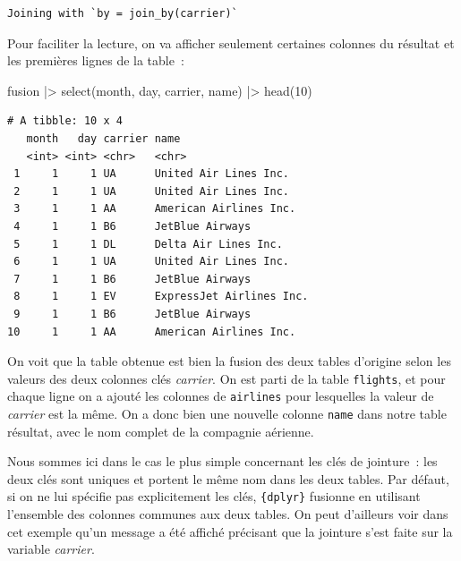 \documentclass[
  letterpaper,
  DIV=11,
  numbers=noendperiod,
  oneside]{scrreprt}
\newenvironment{Shaded}{\begin{snugshade}}{\end{snugshade}}
\newcommand{\DecValTok}[1]{\textcolor[rgb]{0.68,0.00,0.00}{#1}}
\newcommand{\FunctionTok}[1]{\textcolor[rgb]{0.28,0.35,0.67}{#1}}
\newcommand{\NormalTok}[1]{\textcolor[rgb]{0.00,0.23,0.31}{#1}}
\newcommand{\SpecialCharTok}[1]{\textcolor[rgb]{0.37,0.37,0.37}{#1}}
\begin{document}
\begin{verbatim}
Joining with `by = join_by(carrier)`
\end{verbatim}

Pour faciliter la lecture, on va afficher seulement certaines colonnes
du résultat et les premières lignes de la table~:

\begin{Shaded}
\begin{Highlighting}[]
\NormalTok{fusion }\SpecialCharTok{|\textgreater{}} 
  \FunctionTok{select}\NormalTok{(month, day, carrier, name) }\SpecialCharTok{|\textgreater{}} 
  \FunctionTok{head}\NormalTok{(}\DecValTok{10}\NormalTok{)}
\end{Highlighting}
\end{Shaded}

\begin{verbatim}
# A tibble: 10 x 4
   month   day carrier name                    
   <int> <int> <chr>   <chr>                   
 1     1     1 UA      United Air Lines Inc.   
 2     1     1 UA      United Air Lines Inc.   
 3     1     1 AA      American Airlines Inc.  
 4     1     1 B6      JetBlue Airways         
 5     1     1 DL      Delta Air Lines Inc.    
 6     1     1 UA      United Air Lines Inc.   
 7     1     1 B6      JetBlue Airways         
 8     1     1 EV      ExpressJet Airlines Inc.
 9     1     1 B6      JetBlue Airways         
10     1     1 AA      American Airlines Inc.  
\end{verbatim}

On voit que la table obtenue est bien la fusion des deux tables
d'origine selon les valeurs des deux colonnes clés \emph{carrier}. On
est parti de la table \texttt{flights}, et pour chaque ligne on a ajouté
les colonnes de \texttt{airlines} pour lesquelles la valeur de
\emph{carrier} est la même. On a donc bien une nouvelle colonne
\texttt{name} dans notre table résultat, avec le nom complet de la
compagnie aérienne.

\begin{tcolorbox}[enhanced jigsaw, colbacktitle=quarto-callout-note-color!10!white, opacityback=0, toprule=.15mm, colback=white, coltitle=black, bottomtitle=1mm, toptitle=1mm, titlerule=0mm, rightrule=.15mm, title=\textcolor{quarto-callout-note-color}{\faInfo}\hspace{0.5em}{Note}, breakable, bottomrule=.15mm, opacitybacktitle=0.6, arc=.35mm, left=2mm, leftrule=.75mm, colframe=quarto-callout-note-color-frame]

Nous sommes ici dans le cas le plus simple concernant les clés de
jointure~: les deux clés sont uniques et portent le même nom dans les
deux tables. Par défaut, si on ne lui spécifie pas explicitement les
clés, \texttt{\{dplyr\}} fusionne en utilisant l'ensemble des colonnes
communes aux deux tables. On peut d'ailleurs voir dans cet exemple qu'un
message a été affiché précisant que la jointure s'est faite sur la
variable \emph{carrier}.

\end{tcolorbox}
\end{document}
